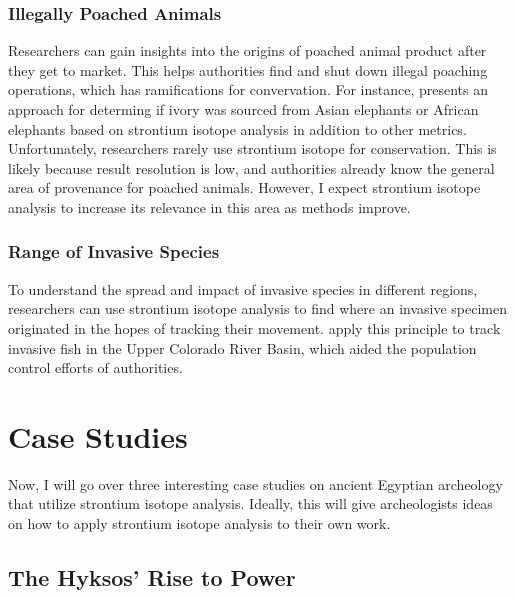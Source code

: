 \documentclass[a4paper, 12pt]{article}
\begin{document}
\subsubsection{Illegally Poached Animals}
Researchers can gain insights into the origins of poached animal product after
they get to market. This helps authorities find and shut down illegal poaching
operations, which has ramifications for convervation. For instance, \cite{singh2006}
presents an approach for determing if ivory was sourced from Asian elephants or African elephants based
on strontium isotope analysis in addition to other metrics.
Unfortunately, researchers rarely use
strontium isotope for conservation. This is likely because result resolution is low,
and authorities already know the general area of provenance for poached animals.
However, I expect strontium isotope analysis to increase its relevance in this
area as methods improve.


\subsubsection{Range of Invasive Species}
To understand the spread and impact of invasive species in different regions,
researchers can use strontium isotope analysis to find where an invasive
specimen originated in the hopes of tracking their movement. \cite{wolff2012} apply this principle
to track invasive fish in the Upper Colorado River Basin, which aided the population
control efforts of authorities.

\section{Case Studies}
Now, I will go over three interesting case studies on ancient Egyptian archeology
that utilize strontium isotope analysis. Ideally, this will give archeologists ideas on how to apply strontium isotope analysis to
their own work.
\subsection{The Hyksos' Rise to Power}
\end{document}
